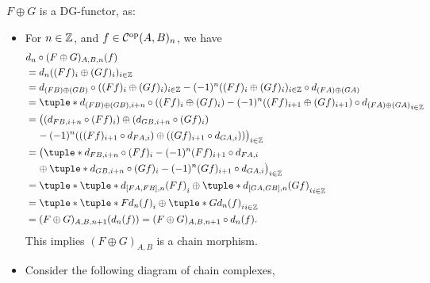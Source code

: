 \begin{remark}
    \( F \oplus G \) is a DG-functor, as:
    \begin{itemize}
        \item {
            For \( n \in {\mathbb{Z}} \), and \( f \in {\mathcal{C}}^{\operatorname{op}}(A, B)_n \), we have
            \begin{align*}
                &d_n \circ (F \oplus G)_{A, B, n} (f) \\
                &= d_n ((F f)_i \oplus (G f)_i)_{i \in \Zb} \\
                &= d_{(F B) \oplus (G B)} \circ ((F f)_i \oplus (G f)_i)_{i \in \Zb} - (-1)^n ((F f)_i \oplus (G f)_i)_{i \in \Zb} \circ d_{(F A) \oplus (G A)} \\
                &= \tuple*{d_{(F B) \oplus (G B), i + n} \circ ((F f)_i \oplus (G f)_i) - (-1)^n ((F f)_{i + 1} \oplus (G f)_{i + 1}) \circ d_{(F A) \oplus (G A)}}_{i \in \Zb} \\
                &= \big( (d_{F B, i + n} \circ (F f)_i) \oplus (d_{G B, i + n} \circ (G f)_i) \\
                &\hspace{0.4cm} - (-1)^n ( ( (F f)_{i + 1} \circ d_{F A, i} ) \oplus ( (G f)_{i + 1} \circ d_{G A, i} ) ) \big)_{i \in \Zb} \\
                &= \big( \tuple*{d_{F B, i + n} \circ (F f)_i - (-1)^n (F f)_{i + 1} \circ d_{F A, i}} \\
                &\hspace{0.4cm} \oplus \tuple*{d_{G B, i + n} \circ (G f)_i - (-1)^n (G f)_{i + 1} \circ d_{G A, i}} \big)_{i \in \Zb} \\
                &= \tuple*{ \tuple*{d_{[F A, F B], n} (F f)}_i \oplus \tuple*{ d_{[G A, G B], n} (G f)}_i }_{i \in \Zb} \\
                &= \tuple*{ \tuple*{F d_n (f)}_i \oplus \tuple*{ G d_n (f)}_i }_{i \in \Zb} \\
                &= (F \oplus G)_{A, B, n + 1} (d_n (f)) = (F \oplus G)_{A, B, n + 1} \circ d_n (f).
            \end{align*}
            This implies \( (F \oplus G)_{A, B} \) is a chain morphism.
        }
        \item {
            Consider the following diagram of chain complexes,
            \begin{center}
\end{center}}
\end{itemize}
\end{remark}
